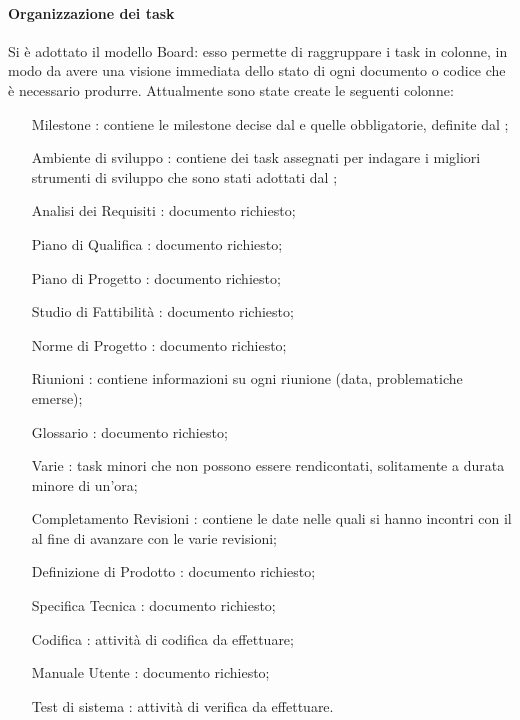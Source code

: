 \paragraph{Organizzazione dei task} Si è adottato il modello Board: esso permette di raggruppare i task in colonne, in modo da avere una visione immediata dello stato di ogni documento o codice che è necessario produrre.
Attualmente sono state create le seguenti colonne:

\begin{itemize}
\item [Milestone]: contiene le milestone decise dal  e quelle obbligatorie, definite dal \TV;
\item [Ambiente di sviluppo]: contiene dei task assegnati per indagare i migliori strumenti di sviluppo che sono stati adottati dal ;
\item [Analisi dei Requisiti]: documento richiesto;
\item [Piano di Qualifica]: documento richiesto;
\item [Piano di Progetto]: documento richiesto;
\item [Studio di Fattibilità]: documento richiesto;
\item [Norme di Progetto]: documento richiesto;
\item [Riunioni]: contiene informazioni su ogni riunione (data, problematiche emerse);
\item [Glossario]: documento richiesto;
\item [Varie]: task minori che non possono essere rendicontati, solitamente a durata minore di un'ora;
\item [Completamento Revisioni]: contiene le date nelle quali si hanno incontri con il \TV al fine di avanzare con le varie revisioni; 
\item [Definizione di Prodotto]: documento richiesto;
\item [Specifica Tecnica]: documento richiesto;
\item [Codifica]: attività di codifica da effettuare;
\item [Manuale Utente]: documento richiesto;
\item [Test di sistema]: attività di verifica da effettuare.
\end{itemize}

